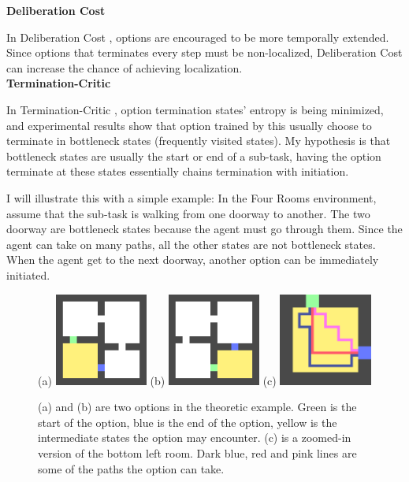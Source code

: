 \documentclass{article}
\begin{document}
	\large{\bfseries{Deliberation Cost}}\vspace{0.05in}
	
	\normalsize{\quad In Deliberation Cost \cite{harb2017waiting}, options are encouraged to be more temporally extended. Since options that terminates every step must be non-localized, Deliberation Cost can increase the chance of achieving localization.}\vspace{0.15in}\\
	\large{\bfseries{Termination-Critic}}\vspace{0.05in}
	
	\normalsize{\quad In Termination-Critic \cite{harutyunyan2019termination}, option termination states' entropy is being minimized, and experimental results show that option trained by this usually choose to terminate in bottleneck states (frequently visited states). My hypothesis is that bottleneck states are usually the start or end of a sub-task, having the option terminate at these states essentially chains termination with initiation.
		
	\quad I will illustrate this with a simple example: In the Four Rooms environment, assume that the sub-task is walking from one doorway to another. The two doorway are bottleneck states because the agent must go through them. Since the agent can take on many paths, all the other states are not bottleneck states. When the agent get to the next doorway, another option can be immediately initiated.}
	\begin{figure}[h]
		\centering
		\large{(a)}
		\includegraphics[width=1.2in]{termCrit1.png}
		\hspace{0.2in}
		\large{(b)}
		\includegraphics[width=1.2in]{termCrit2.png}
		\hspace{0.2in}
		\large{(c)}
		\includegraphics[width=1.2in]{termCrit3.png}
		\caption{(a) and (b) are two options in the theoretic example. Green is the start of the option, blue is the end of the option, yellow is the intermediate states the option may encounter. (c) is a zoomed-in version of the bottom left room. Dark blue, red and pink lines are some of the paths the option can take.}
	\end{figure}\vspace{0.15in}\\
\end{document}
